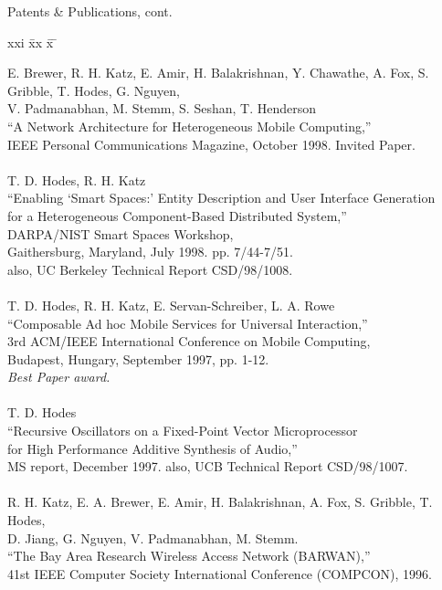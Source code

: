 \newpage
\begin{bf} \large
Patents \& Publications, cont.
\end{bf}
\begin{tabbing}
xxi \= xx \= x \= \kill

\>    E. Brewer, R. H. Katz, E. Amir, H. Balakrishnan, Y. Chawathe, A. Fox,
    S. Gribble, T. Hodes, G. Nguyen, \\
\>\>\> V. Padmanabhan, M. Stemm, S. Seshan, T. Henderson \\
\>\>      ``A Network Architecture for Heterogeneous Mobile Computing,'' \\
\>\>       IEEE Personal Communications Magazine, October 1998. Invited Paper. \\
\smallskip \\[-3pt]
\>    T. D. Hodes, R. H. Katz \\
\>\>      ``Enabling `Smart Spaces:' Entity Description and User Interface
        Generation \\
\>\>\>     for a Heterogeneous Component-Based Distributed System,'' \\
\>\>       DARPA/NIST Smart Spaces Workshop,  \\
\>\>       Gaithersburg, Maryland, July 1998.  pp. 7/44-7/51.  \\
\>\>       also, UC Berkeley Technical Report CSD/98/1008. \\


\smallskip \\[-3pt]
\>    T. D. Hodes, R. H. Katz, E. Servan-Schreiber, L. A. Rowe \\
\>\>      ``Composable Ad hoc Mobile Services for Universal Interaction,'' \\
\>\>       3rd ACM/IEEE International Conference on Mobile Computing,  \\
\>\>        Budapest, Hungary, September 1997, pp. 1-12. \\
\>\>        {\em Best Paper award. }\\
\smallskip \\[-3pt]
\>    T. D. Hodes \\
\>\>      ``Recursive Oscillators on a Fixed-Point Vector Microprocessor \\
\>\>\>     for High Performance Additive Synthesis of Audio,'' \\
\>\>       MS report, December 1997. also, UCB Technical Report CSD/98/1007. \\

\smallskip \\[-3pt]
\>    R. H. Katz, E. A. Brewer, E. Amir, H. Balakrishnan, A. Fox,
       S. Gribble, T. Hodes, \\
\>\>\>   D. Jiang, G. Nguyen, V. Padmanabhan, M. Stemm. \\
\>\> ``The Bay Area Research Wireless Access Network (BARWAN),''  \\
\>\> 41st IEEE Computer Society International Conference (COMPCON), 1996. \\




\end{tabbing}
